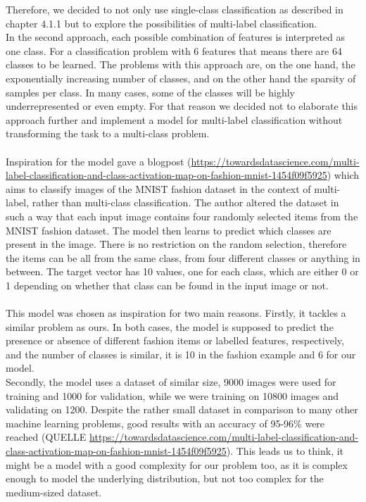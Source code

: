 Therefore, we decided to not only use single-class classification as described in chapter 4.1.1 but to explore the possibilities of multi-label classification. \\
In the second approach, each possible combination of features is interpreted as one class. For a classification problem with 6 features that means there are 64 classes to be learned. The problems with this approach are, on the one hand, the exponentially increasing number of classes, and on the other hand the sparsity of samples per class. In many cases, some of the classes will be highly underrepresented or even empty. For that reason we decided not to elaborate this approach further and implement a model for multi-label classification without transforming the task to a multi-class problem. \\
\\
Inspiration for the model gave a blogpost (\url{https://towardsdatascience.com/multi-label-classification-and-class-activation-map-on-fashion-mnist-1454f09f5925}) which aims to classify images of the MNIST fashion dataset in the context of multi-label, rather than multi-class classification. The author altered the dataset in such a way that each input image contains four randomly selected items from the MNIST fashion dataset. The model then learns to predict which classes are present in the image. There is no restriction on the random selection, therefore the items can be all from the same class, from four different classes or anything in between. The target vector has 10 values, one for each class, which are either 0 or 1 depending on whether that class can be found in the input image or not. \\
\\
This model was chosen as inspiration for two main reasons. Firstly, it tackles a similar problem as ours. In both cases, the model is supposed to predict the presence or absence of different fashion items or labelled features, respectively, and the number of classes is similar, it is 10 in the fashion example and 6 for our model. \\
Secondly, the model uses a dataset of similar size, 9000 images were used for training and 1000 for validation, while we were training on 10800 images and validating on 1200. Despite the rather small dataset in comparison to many other machine learning problems, good results with an accuracy of 95-96\% were reached (QUELLE \url{https://towardsdatascience.com/multi-label-classification-and-class-activation-map-on-fashion-mnist-1454f09f5925}). This leads us to think, it might be a model with a good complexity for our problem too, as it is complex enough to model the underlying distribution, but not too complex for the medium-sized dataset.
